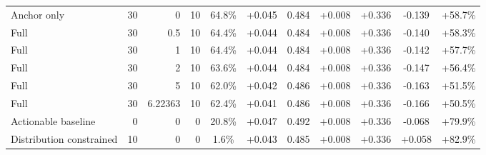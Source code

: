 \begin{table}[htbp]
\begin{tabular}{lrrrccccccc}
Anchor only & 30 & 0 & 10 & 64.8\% & +0.045 & 0.484 & +0.008 & +0.336 & -0.139 & +58.7\% \\
Full & 30 & 0.5 & 10 & 64.4\% & +0.044 & 0.484 & +0.008 & +0.336 & -0.140 & +58.3\% \\
Full & 30 & 1 & 10 & 64.4\% & +0.044 & 0.484 & +0.008 & +0.336 & -0.142 & +57.7\% \\
Full & 30 & 2 & 10 & 63.6\% & +0.044 & 0.484 & +0.008 & +0.336 & -0.147 & +56.4\% \\
Full & 30 & 5 & 10 & 62.0\% & +0.042 & 0.486 & +0.008 & +0.336 & -0.163 & +51.5\% \\
Full & 30 & 6.22363 & 10 & 62.4\% & +0.041 & 0.486 & +0.008 & +0.336 & -0.166 & +50.5\% \\
Actionable baseline & 0 & 0 & 0 & 20.8\% & +0.047 & 0.492 & +0.008 & +0.336 & -0.068 & +79.9\% \\
Distribution constrained & 10 & 0 & 0 & 1.6\% & +0.043 & 0.485 & +0.008 & +0.336 & +0.058 & +82.9\% \\
\bottomrule
\end{tabular}
\end{table}